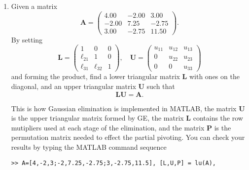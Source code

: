 \documentclass[11pt,a4paper]{article}
\def\bA{\mathbf{A}}
\begin{document}
\begin{enumerate}
\item\label{qdjsx4}
Given a matrix
$$\bA= \left ( \begin{array}{rrr}
         4.00 & -2.00 & 3.00\\
        -2.00 &  7.25 & -2.75 \\
         3.00 & -2.75 & 11.50 \
         \end{array} \right ) . $$
  By setting 
$$  \mathbf{L} =  \left ( \begin{array}{rrr}
         1 & 0 & 0\\
        \ell_{21} &  1 &  0 \\
        \ell_{31} & \ell_{32} & 1
         \end{array} \right ),  \quad
          \mathbf{U} =  \left ( \begin{array}{rrr}
         u_{11} & u_{12} & u_{13} \\
        0  &  u_{22} & u_{23} \\
        0 & 0  & u_{33}    \end{array} \right )
        $$
 and forming the product,
find a lower triangular matrix $ \mathbf{L}$ with ones on the diagonal,
and an upper  triangular matrix $ \mathbf{U}$ such that 
$$  \mathbf{L} \mathbf{U} = \bA.$$

 This is how Gaussian elimination is implemented in MATLAB,
 the matrix $\mathbf{U} $ is the upper triangular matrix formed by GE, the
 matrix $\mathbf{L} $ contains the row mutipliers used at each stage
 of the elimination, and the matrix $\mathbf{P}$  is the permutation 
 matrix   needed  to effect the partial pivoting.
You can check your results by typing the MATLAB command sequence
\begin{verbatim}
>> A=[4,-2,3;-2,7.25,-2.75;3,-2.75,11.5], [L,U,P] = lu(A),
\end{verbatim}



\end{enumerate}

\vfill\eject
\end{document}
